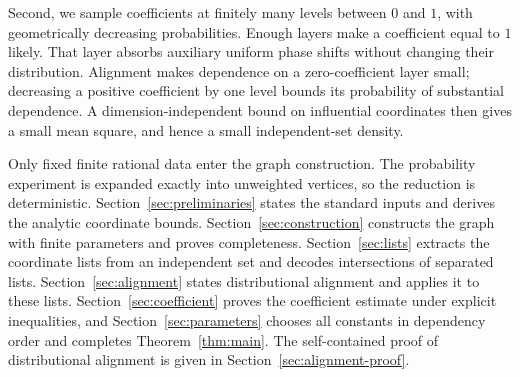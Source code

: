 Second, we sample coefficients at finitely many levels between $0$ and
$1$, with geometrically decreasing probabilities. Enough layers make
a coefficient equal to $1$ likely. That layer absorbs auxiliary uniform
phase shifts without changing their distribution. Alignment makes
dependence on a zero-coefficient layer small; decreasing a positive
coefficient by one level bounds its probability of substantial
dependence. A dimension-independent bound on influential coordinates
then gives a small mean square, and hence a small independent-set density.

Only fixed finite rational data enter the graph construction.
The probability experiment is expanded exactly into unweighted vertices,
so the reduction is deterministic.
Section~\ref{sec:preliminaries} states the standard inputs and derives
the analytic coordinate bounds.
Section~\ref{sec:construction} constructs the graph with finite parameters
and proves completeness. Section~\ref{sec:lists} extracts the coordinate
lists from an independent set and decodes intersections of separated lists.
Section~\ref{sec:alignment} states distributional alignment and applies
it to these lists. Section~\ref{sec:coefficient} proves the coefficient
estimate under explicit inequalities, and Section~\ref{sec:parameters}
chooses all constants in dependency order and completes
Theorem~\ref{thm:main}. The self-contained proof of distributional
alignment is given in Section~\ref{sec:alignment-proof}.
